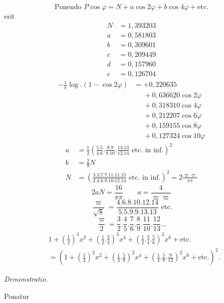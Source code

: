 \begin{equation}\tag*{[40]}\text{Ponendo }P\cos\varphi=N+a\cos2\varphi+b\cos4\varphi+\text{etc.}\end{equation}
\noindent erit
\[\begin{aligned}
N&=1{,}393203\\
a&=0{,}581803\\
b&=0{,}309601\\
c&=0{,}209449\\
d&=0{,}157960\\
e&=0{,}126704
\end{aligned}\]
\[\begin{aligned}
-\frac1\pi\log.(1-\cos2\varphi)&=+0{,}220635\\
&\phantom{=}+0{,}636620\cos2\varphi\\
&\phantom{=}+0{,}318310\cos4\varphi\\
&\phantom{=}+0{,}212207\cos6\varphi\\
&\phantom{=}+0{,}159155\cos8\varphi\\
&\phantom{=}+0{,}127324\cos10\varphi
\end{aligned}\]
\[\begin{aligned}
a&=\frac12\left(\frac{5.5}{4.6}.\frac{9.9}{8.10}.\frac{13.13}{12.14}\text{ etc. in inf.}\right)^2\\
b&=\frac29N\\
N&=\left(\frac{3.3.7.7.11.11.15}{2.4.6.8.10.12.14}\text{ etc. in inf.}\right)^2
=2\frac{\varpi\varpi}{\pi\pi}
\end{aligned}\]
\[2aN=\frac{16}{\pi\pi}\qquad a=\frac4{\varpi\varpi}\]
\[\frac{\varpi}{\surd8}=\frac{4.6.8.10.12.14}{5.5.9.9.13.13}\text{ etc.}\]
\[\frac{\varpi}2=\frac32.\frac45.\frac76.\frac89.\frac{11}{10}.\frac{12}{13}\ldots\]
{\small\begin{equation}\tag*{[41]}\begin{aligned}
&1+\left(\frac12\right)^3x^2+\left(\frac12.\frac34\right)^3x^4
+\left(\frac12.\frac34.\frac56\right)^3x^6+\text{etc.}\\
&=\left(1+\left(\frac14\right)^2x^2+\left(\frac14.\frac58\right)^2x^4
+\left(\frac14.\frac58.\frac9{12}\right)^2x^6+\text{etc.}\right)^2.
\end{aligned}\end{equation}}
\clearpage
{}
\begin{center}\textit{Demonstratio.}\end{center}
\par\indent Ponatur
